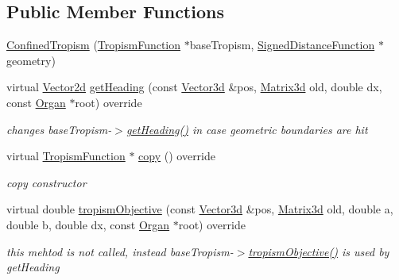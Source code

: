 \subsection*{Public Member Functions}
\begin{DoxyCompactItemize}
\item 
\hyperlink{classCPlantBox_1_1ConfinedTropism_a7d90df6c52e1efe154e8e1d9f34a44fb}{Confined\+Tropism} (\hyperlink{classCPlantBox_1_1TropismFunction}{Tropism\+Function} $\ast$base\+Tropism, \hyperlink{classCPlantBox_1_1SignedDistanceFunction}{Signed\+Distance\+Function} $\ast$geometry)
\item 
virtual \hyperlink{classCPlantBox_1_1Vector2d}{Vector2d} \hyperlink{classCPlantBox_1_1ConfinedTropism_abc56888ea510bc66369c36df3d43ce42}{get\+Heading} (const \hyperlink{classCPlantBox_1_1Vector3d}{Vector3d} \&pos, \hyperlink{classCPlantBox_1_1Matrix3d}{Matrix3d} old, double dx, const \hyperlink{classCPlantBox_1_1Organ}{Organ} $\ast$root) override
\begin{DoxyCompactList}\small\item\em changes base\+Tropism-\/$>$\hyperlink{classCPlantBox_1_1ConfinedTropism_abc56888ea510bc66369c36df3d43ce42}{get\+Heading()} in case geometric boundaries are hit \end{DoxyCompactList}\item 
\mbox{\label{classCPlantBox_1_1ConfinedTropism_ad0687d23227c9e52af8873a6d8ab8065}} 
virtual \hyperlink{classCPlantBox_1_1TropismFunction}{Tropism\+Function} $\ast$ \hyperlink{classCPlantBox_1_1ConfinedTropism_ad0687d23227c9e52af8873a6d8ab8065}{copy} () override
\begin{DoxyCompactList}\small\item\em copy constructor \end{DoxyCompactList}\item 
\mbox{\label{classCPlantBox_1_1ConfinedTropism_aaa264e2b61755ecaf9baf5f6c43487e0}} 
virtual double \hyperlink{classCPlantBox_1_1ConfinedTropism_aaa264e2b61755ecaf9baf5f6c43487e0}{tropism\+Objective} (const \hyperlink{classCPlantBox_1_1Vector3d}{Vector3d} \&pos, \hyperlink{classCPlantBox_1_1Matrix3d}{Matrix3d} old, double a, double b, double dx, const \hyperlink{classCPlantBox_1_1Organ}{Organ} $\ast$root) override
\begin{DoxyCompactList}\small\item\em this mehtod is not called, instead base\+Tropism-\/$>$\hyperlink{classCPlantBox_1_1ConfinedTropism_aaa264e2b61755ecaf9baf5f6c43487e0}{tropism\+Objective()} is used by get\+Heading \end{DoxyCompactList}\end{DoxyCompactItemize}

